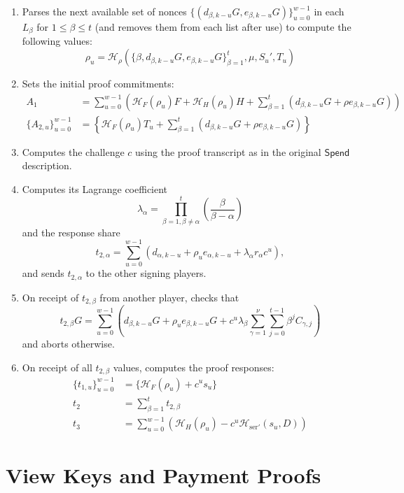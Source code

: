\documentclass{llncs}
\newcommand{\hash}{\mathcal{H}}
\newcommand{\func}[1]{\mathsf{#1}}
\begin{document}
\begin{enumerate}
    \item Parses the next available set of nonces $\{(d_{\beta,k-u}G,e_{\beta,k-u}G)\}_{u=0}^{w-1}$ in each $L_\beta$ for $1 \leq \beta \leq t$ (and removes them from each list after use) to compute the following values:
    $$\rho_u = \hash_{\rho}(\{\beta,d_{\beta,k-u}G,e_{\beta,k-u}G\}_{\beta=1}^{t},\mu,S_u',T_u)$$
    \item Sets the initial proof commitments:
    \begin{align*}
        A_1 &= \sum_{u=0}^{w-1} \left( \hash_F(\rho_u)F + \hash_H(\rho_u)H + \sum_{\beta=1}^t \left( d_{\beta,k-u}G + \rho e_{\beta,k-u}G \right) \right) \\
        \{A_{2,u}\}_{u=0}^{w-1} &= \left\{ \hash_F(\rho_u)T_u + \sum_{\beta=1}^t \left( d_{\beta,k-u}G + \rho e_{\beta,k-u}G \right) \right\}
    \end{align*}
    \item Computes the challenge $c$ using the proof transcript as in the original $\func{Spend}$ description.
    \item Computes its Lagrange coefficient $$\lambda_\alpha = \prod_{\beta=1,\beta \neq \alpha}^t \left( \frac{\beta}{\beta-\alpha} \right)$$ and the response share $$t_{2,\alpha} = \sum_{u=0}^{w-1} (d_{\alpha,k-u} + \rho_u e_{\alpha,k-u} + \lambda_\alpha r_\alpha c^u),$$ and sends $t_{2,\alpha}$ to the other signing players.
    \item On receipt of $t_{2,\beta}$ from another player, checks that $$t_{2,\beta}G = \sum_{u=0}^{w-1} \left( d_{\beta,k-u}G + \rho_u e_{\beta,k-u}G + c^u\lambda_{\beta} \sum_{\gamma=1}^{\nu}\sum_{j=0}^{t-1} \beta^j C_{\gamma,j} \right)$$ and aborts otherwise.
    \item On receipt of all $t_{2,\beta}$ values, computes the proof responses:
    \begin{align*}
        \{t_{1,u}\}_{u=0}^{w-1} &= \{ \hash_F(\rho_u) + c^u s_u \} \\
        t_2 &= \sum_{\beta=1}^t t_{2,\beta} \\
        t_3 &= \sum_{u=0}^{w-1} (\hash_H(\rho_u) - c^u \hash_{\text{ser}'}(s_u,D))
    \end{align*}
\end{enumerate}


\section{View Keys and Payment Proofs}
\end{document}

